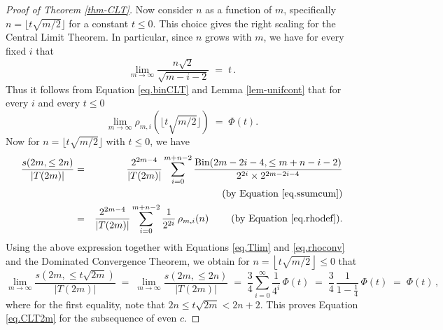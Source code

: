 \documentclass[11pt]{amsart}
\theoremstyle{definition}
\theoremstyle{remark}
\numberwithin{equation}{section}
\begin{document}
\begin{proof}[Proof of Theorem \ref{thm-CLT}]
Now consider $n$ as a function of $m$, specifically $n=\lfloor t\sqrt{m/2}\rfloor$ for a constant $t\leq 0$.  This choice gives the right scaling for the Central Limit Theorem.  In particular, 
since $n$ grows with $m$, we have for every fixed $i$ that     
\[    \lim_{ m\rightarrow\infty} \frac{n\sqrt{2}}{\sqrt{m-i-2}}   \;=\;  t\,.
\]
Thus it follows from Equation \eqref{eq.binCLT} and Lemma \ref{lem-unifcont}  that for every $i$ and every $t\leq 0$
\begin{equation}
    \label{eq.rhoconv}
      \lim_{m\rightarrow\infty}\rho_{m,i}\left(\lfloor t\sqrt{m/2}\rfloor \right)   \;=\;  \Phi(t).
\end{equation}
Now for $n=\lfloor t\sqrt{m/2}\rfloor$ with $t\leq 0$, we have
\begin{eqnarray}
   \nonumber
     \frac{s(2m,\leq 2n)}{|T(2m)|}  & = & \frac{2^{2m-4}}{|T(2m)|}\sum_{i=0}^{m+n-2}  
        \frac{   \mbox{Bin}(2m-2i-4,\leq m+n-i-2) }{ 2^{2i} \times 2^{2m-2i-4}}
     \\
     \nonumber
       & &    \hspace{15mm}\hbox{(by Equation \eqref{eq.ssumcum})}
     \\
     \nonumber
     & = & \frac{2^{2m-4}}{|T(2m)|}\sum_{i=0}^{m+n-2}  \frac{1}{2^{2i}} \, \rho_{m,i}(n)
                \hspace{8mm}\hbox{(by Equation \eqref{eq.rhodef})}.
\end{eqnarray}
Using the above expression together with Equations \eqref{eq.Tlim} and \eqref{eq.rhoconv} and the Dominated Convergence 
Theorem, we obtain for  $n=\left\lfloor t\sqrt{m/2}\right\rfloor\leq 0$ that
\begin{equation*}
   \label{eq.soverTlim}
     \lim_{m\rightarrow\infty}  \frac{s\left(2m,\leq t\sqrt{2m}\right)}{|T(2m)|} 
      \;=\;   \lim_{m\rightarrow\infty}  \frac{s(2m,\leq 2n)}{|T(2m)|}  \;=\;     
      \frac{3}{4}\sum_{i=0}^{\infty}\frac{1}{4^i}\,\Phi(t)  
      \;=\; \frac{3}{4} \,\frac{1}{1-\frac{1}{4}} \,\Phi(t) \;=\;  \Phi(t) \,,
\end{equation*}
where for the first equality, note that $2n\leq t\sqrt{2m} < 2n+2$.  
This proves Equation \eqref{eq.CLT2m} for the subsequence of even $c$.



\end{proof}
\end{document}
